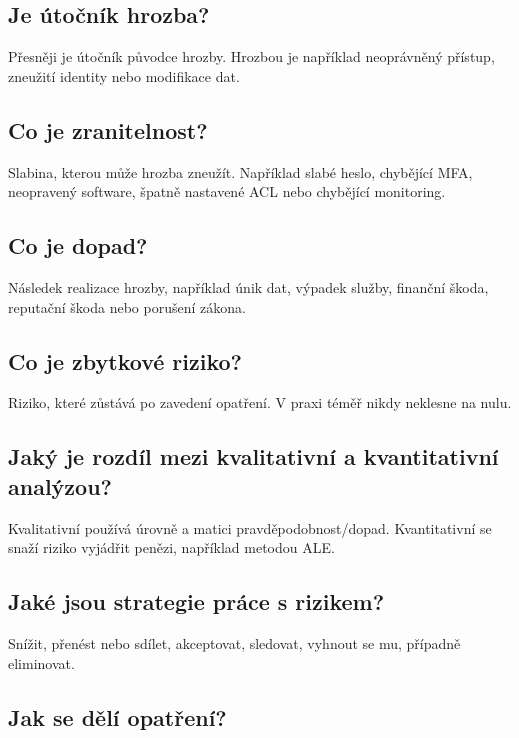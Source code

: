 \documentclass[11pt,a4paper]{article}
\begin{document}
\subsection*{Je útočník hrozba?}

Přesněji je útočník původce hrozby. Hrozbou je například neoprávněný přístup, zneužití identity nebo modifikace dat.

\subsection*{Co je zranitelnost?}

Slabina, kterou může hrozba zneužít. Například slabé heslo, chybějící MFA, neopravený software, špatně nastavené ACL nebo chybějící monitoring.

\subsection*{Co je dopad?}

Následek realizace hrozby, například únik dat, výpadek služby, finanční škoda, reputační škoda nebo porušení zákona.

\subsection*{Co je zbytkové riziko?}

Riziko, které zůstává po zavedení opatření. V praxi téměř nikdy neklesne na nulu.

\subsection*{Jaký je rozdíl mezi kvalitativní a kvantitativní analýzou?}

Kvalitativní používá úrovně a matici pravděpodobnost/dopad. Kvantitativní se snaží riziko vyjádřit penězi, například metodou ALE.

\subsection*{Jaké jsou strategie práce s rizikem?}

Snížit, přenést nebo sdílet, akceptovat, sledovat, vyhnout se mu, případně eliminovat.

\subsection*{Jak se dělí opatření?}
\end{document}
